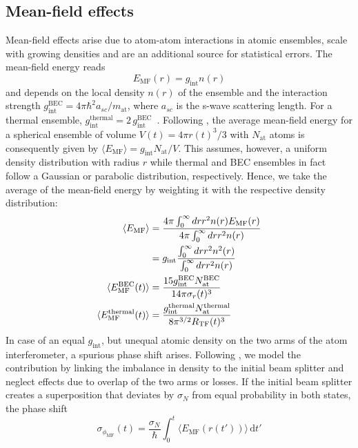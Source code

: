 \subsection{Mean-field effects}\label{subsec:MF-effects}
Mean-field effects arise due to atom-atom interactions in atomic ensembles, scale with growing densities and are an additional source for statistical errors. The mean-field energy reads
\begin{equation}
     E_\text{MF}(r)= g_\text{int}n(r)
\end{equation}
and depends on the local density $n(r)$ of the ensemble and the interaction strength $g_\text{int}^\text{BEC} = 4\pi\hbar^2a_{sc}/m_\text{at}$, where $a_{sc}$ is the s-wave scattering length. For a thermal ensemble, $g_\text{int}^\text{thermal} = 2\,g_\text{int}^\text{BEC}$~\cite{GuryOdelin2002}. Following \cite{Debs2011}, the average mean-field energy for a spherical ensemble of volume $V(t)=4\pi r(t)^3/3$ with $N_\text{at}$ atoms is consequently given by $\langle E_\text{MF}\rangle = g_\text{int} N_\text{at}/V$.
This assumes, however, a uniform density distribution with radius $r$ while thermal and BEC ensembles in fact follow a Gaussian or parabolic distribution, respectively. Hence, we take the average of the mean-field energy by weighting it with the respective density distribution:
\begin{align}
    \langle E_\text{MF}\rangle&=\frac{4 \pi \int_0^\infty dr r^2 n(r) E_\text{MF}(r)}{4 \pi \int_0^\infty dr r^2 n(r)}\notag\\
    &=g_\text{int}\frac{\int_0^\infty dr r^2 n^2(r)}{\int_0^\infty dr r^2 n(r)}\\
    \langle E_\text{MF}^\text{BEC}(t)\rangle&=\frac{15 g_\text{int}^\text{BEC} N_\text{at}^\text{BEC}}{14 \pi \sigma_r(t)^3}\\
    \langle E_\text{MF}^\text{thermal}(t)\rangle&=\frac{g_\text{int}^\text{thermal} N_\text{at}^\text{thermal}}{8 \pi^{3/2} R_\text{TF}(t)^3}
\end{align}
In case of an equal $g_\text{int}$, but unequal atomic density on the two arms of the atom interferometer, a spurious phase shift arises.
Following \cite{Debs2011}, we model the contribution by linking the imbalance in density to the initial beam splitter and neglect effects due to overlap of the two arms or losses.
If the initial beam splitter creates a superposition that deviates by $\sigma_N$ from equal probability in both states, the phase shift
\begin{equation}\label{eq:MF}
\sigma_{\phi_\text{MF}}(t) = \frac{\sigma_N}{\hbar} \int_0^t \langle E_\text{MF}(r(t'))\rangle\,\text{d}t'
\end{equation}
